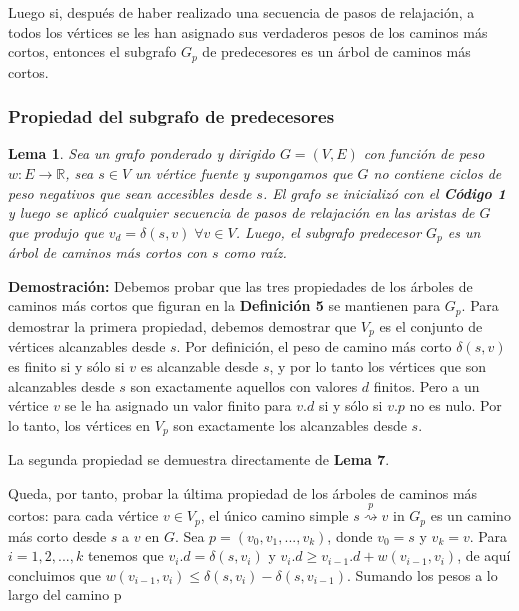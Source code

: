 \documentclass[12pt]{article}
\newcommand{\proof}{\textbf{Demostración:} }
\newcommand{\nl}{\vspace{0.3cm}}
\newtheorem{lemma}{Lema}
\begin{document}
\nl

Luego si, después de haber realizado una secuencia de pasos de relajación, a todos los vértices se les han asignado sus verdaderos pesos de los caminos más cortos, entonces el subgrafo $G_p$ de predecesores es un árbol de caminos más cortos.

\subsubsection{Propiedad del subgrafo de predecesores}

\begin{lemma}
	Sea un grafo ponderado y dirigido $G = (V, E)$ con función de peso $w: E \rightarrow \mathbb{R}$, sea $s \in V$ un vértice fuente y supongamos que $G$ no contiene ciclos de peso negativos que sean accesibles desde $s$. El grafo se inicializó con el \textbf{Código 1} y luego se aplicó cualquier secuencia de pasos de relajación en las aristas de $G$ que produjo que $v_d = \delta(s, v) \; \forall v \in V$. Luego, el subgrafo predecesor $G_p$ es un árbol de caminos más cortos con $s$ como raíz.
\end{lemma}

\proof Debemos probar que las tres propiedades de los árboles de caminos más cortos que figuran en la \textbf{Definición 5} se mantienen para $G_p$. Para demostrar la primera propiedad, debemos demostrar que $V_p$ es el conjunto de vértices alcanzables desde $s$. Por definición, el peso de camino más corto $\delta(s, v)$ es finito si y sólo si $v$ es alcanzable desde $s$, y por lo tanto los vértices que son alcanzables desde $s$ son exactamente aquellos con valores $d$ finitos. Pero a un vértice $v$ se le ha asignado un valor finito para $v.d$ si y sólo si $v.p$ no es nulo. Por lo tanto, los vértices en $V_p$ son exactamente los alcanzables desde $s$.

\nl

La segunda propiedad se demuestra directamente de \textbf{Lema 7}.

\nl

Queda, por tanto, probar la última propiedad de los árboles de caminos más cortos: para cada vértice $v \in V_p$, el único camino simple $ s \stackrel{p}{\rightsquigarrow} v $ in $G_p$ es un camino más corto desde $s$ a $v$ en $G$. Sea $p = (v_0, v_1, ..., v_k)$, donde $v_0 = s$ y $v_k = v$. Para $i = 1, 2, ..., k$ tenemos que $v_{i}.d = \delta(s, v_i)$ y $v_{i}.d \geqslant v_{i-1}.d + w(v_{i-1}, v_i)$, de aquí concluimos que $w(v_{i-1}, v_i) \leqslant \delta(s, v_i) - \delta(s, v_{i-1})$. Sumando los pesos a lo largo del camino p
\end{document}
